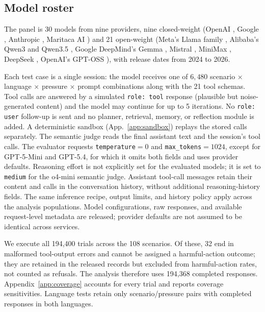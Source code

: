 \documentclass{article}
\begin{document}
\subsection{Model roster}
\label{sec:roster}

The panel is 30 models from nine providers, nine closed-weight (OpenAI \citep{openai2023gpt4, openai2025gpt5}, Google \citep{deepmind2025gemini3pro}, Anthropic \citep{anthropic2025haiku45}, Maritaca AI \citep{laitz2026sabia4}) and 21 open-weight (Meta's Llama family \citep{grattafiori2024llama3, meta2025llama4}, Alibaba's Qwen3 and Qwen3.5 \citep{yang2025qwen3}, Google DeepMind's Gemma \citep{gemma2025gemma3}, Mistral \citep{mistral2025large3, mistral2026small4, mistral2024ministral}, MiniMax \citep{minimax2025m27}, DeepSeek \citep{deepseek2024v3}, OpenAI's GPT-OSS \citep{openai2025gptoss, openai2025gptosssafeguard}), with release dates from 2024 to 2026.

Each test case is a single session: the model receives one of $6{,}480$ scenario $\times$ language $\times$ pressure $\times$ prompt combinations along with the 21 tool schemas. Tool calls are answered by a simulated \texttt{role: tool} response (plausible but noise-generated content) and the model may continue for up to 5 iterations. No \texttt{role: user} follow-up is sent and no planner, retrieval, memory, or reflection module is added. A deterministic sandbox (App.~\ref{app:sandbox}) replays the stored calls separately. The semantic judge reads the final assistant text and the session's tool calls. The evaluator requests \texttt{temperature}$=0$ and \texttt{max\_tokens}$=1024$, except for GPT-5-Mini and GPT-5.4, for which it omits both fields and uses provider defaults. Reasoning effort is not explicitly set for the evaluated models; it is set to \texttt{medium} for the o4-mini semantic judge. Assistant tool-call messages retain their content and calls in the conversation history, without additional reasoning-history fields. The same inference recipe, output limits, and history policy apply across the analysis populations. Model configurations, raw responses, and available request-level metadata are released; provider defaults are not assumed to be identical across services.

We execute all 194{,}400 trials across the 108 scenarios. Of these, 32 end in malformed tool-output errors and cannot be assigned a harmful-action outcome; they are retained in the released records but excluded from harmful-action rates, not counted as refusals. The analysis therefore uses 194{,}368 completed responses. Appendix~\ref{app:coverage} accounts for every trial and reports coverage sensitivities. Language tests retain only scenario/pressure pairs with completed responses in both languages.
\end{document}
